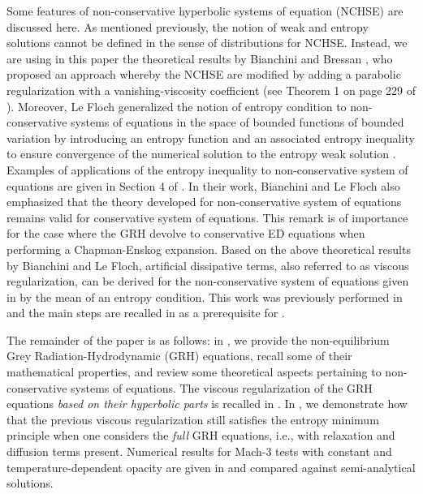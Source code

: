 \documentclass[times,doublespace]{fldauth}%
\begin{document}
Some features of non-conservative hyperbolic systems of equation (NCHSE) are discussed here. As mentioned previously, 
the notion of weak and entropy solutions cannot be defined in the sense of distributions for NCHSE. Instead, we are using in this paper the theoretical results by 
Bianchini and Bressan \cite{bianchini_bressan_2005}, who proposed an approach whereby the NCHSE are modified by adding a parabolic regularization 
with a vanishing-viscosity coefficient (see Theorem 1 on page 229 of \cite{bianchini_bressan_2005}). Moreover, Le Floch generalized the notion of entropy 
condition to non-conservative systems of equations in the space of bounded functions of bounded variation by introducing an entropy function 
and an associated entropy inequality to ensure convergence of the numerical solution to the entropy weak solution \cite{lefloch_1988}. Examples of applications of the
entropy inequality to non-conservative system of equations are given in Section 4 of \cite{lefloch_1988}. In their work, Bianchini and Le Floch also emphasized that the theory developed for non-conservative system of equations remains valid for conservative system of equations. This remark is of importance for the case where the GRH devolve to conservative ED equations when performing a Chapman-Enskog expansion. Based on the above theoretical results by Bianchini and Le Floch, artificial dissipative terms, also referred to as viscous regularization, can be derived for the non-conservative system of equations given in  by the mean of an entropy condition. This work was previously performed in \cite{our_jcp_radhy_paper} and the main steps are recalled in  as a prerequisite for .

The remainder of the paper is as follows: in , we provide
the non-equilibrium Grey Radiation-Hydrodynamic (GRH) equations, recall some of their mathematical properties, 
and review some theoretical aspects pertaining to non-conservative systems of equations. 
The viscous regularization of the GRH equations {\it based on their hyperbolic parts} is recalled in .
In , we demonstrate how that the previous viscous regularization still satisfies the entropy minimum 
principle when one considers the {\it full} GRH equations, i.e., with relaxation and diffusion terms present. 
Numerical results for Mach-3 tests with constant and temperature-dependent opacity are given in  and 
compared against semi-analytical solutions.
\end{document}
